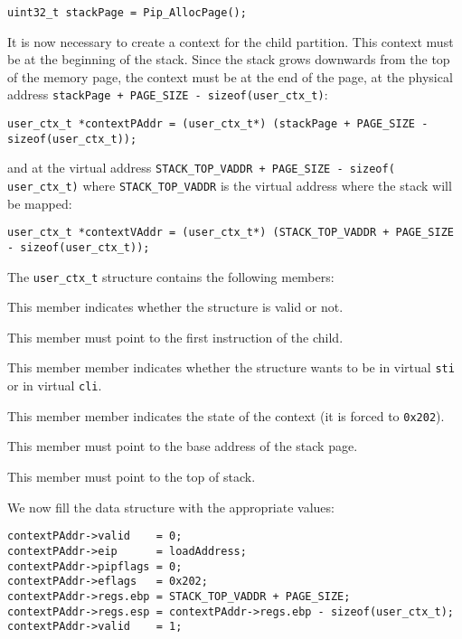 \documentclass[10pt,a4paper,titlepage]{refart}
\begin{document}
\begin{lstlisting}[style=CStyle]
uint32_t stackPage = Pip_AllocPage();
\end{lstlisting}

It is now necessary to create a context for the child partition. This context
must be at the beginning of the stack. Since the stack grows downwards from the
top of the memory page, the context must be at the end of the page, at the
physical address \texttt{stackPage + PAGE\_SIZE - sizeof(user\_ctx\_t)}:

\begin{lstlisting}[style=CStyle]
user_ctx_t *contextPAddr = (user_ctx_t*) (stackPage + PAGE_SIZE - sizeof(user_ctx_t));
\end{lstlisting}

and at the virtual address \texttt{STACK\_TOP\_VADDR + PAGE\_SIZE -
sizeof( user\_ctx\_t)} where \texttt{STACK\_TOP\_VADDR} is the virtual address
where the stack will be mapped:

\begin{lstlisting}[style=CStyle]
user_ctx_t *contextVAddr = (user_ctx_t*) (STACK_TOP_VADDR + PAGE_SIZE - sizeof(user_ctx_t));
\end{lstlisting}

The \texttt{user\_ctx\_t} structure contains the following members:

This member indicates whether the structure is valid or not.

This member must point to the first instruction of the child.

This member member indicates whether the structure wants to be in virtual
\texttt{sti} or in virtual \texttt{cli}.

This member member indicates the state of the context (it is forced to
\texttt{0x202}).

This member must point to the base address of the stack page.

This member must point to the top of stack.

We now fill the data structure with the appropriate values:

\begin{lstlisting}[style=CStyle]
contextPAddr->valid    = 0;
contextPAddr->eip      = loadAddress;
contextPAddr->pipflags = 0;
contextPAddr->eflags   = 0x202;
contextPAddr->regs.ebp = STACK_TOP_VADDR + PAGE_SIZE;
contextPAddr->regs.esp = contextPAddr->regs.ebp - sizeof(user_ctx_t);
contextPAddr->valid    = 1;
\end{lstlisting}
\end{document}
